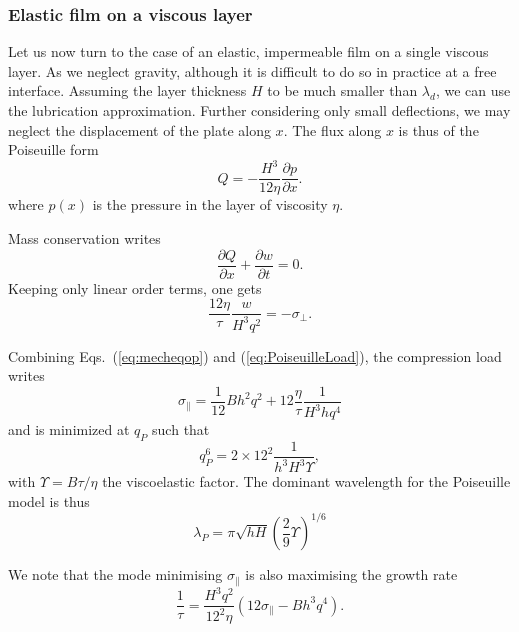\documentclass[twocolumn,superscriptaddress,showpacs,preprintnumbers,
amsmath,amssymb,prl]{revtex4-1}
\begin{document}
\subsubsection*{Elastic film on a viscous layer}
Let us now turn to the case of an elastic, impermeable film on a single viscous layer. As \cite{Huang2002} we neglect gravity, although it is difficult to do so in practice at a free interface. Assuming the layer thickness $H$ to be much smaller than $\lambda_d$, we can use the lubrication approximation. Further considering only small deflections, we may neglect the displacement of the plate along $x$. The flux along $x$ is thus of the Poiseuille form
\begin{equation}
Q = -\frac{H^3}{12\eta}\frac{\partial p}{\partial x}.
\label{eq:PoiseuilleFlux}
\end{equation}
where $p(x)$ is the pressure in the layer of viscosity $\eta$.

Mass conservation writes
\begin{equation}
\frac{\partial Q}{\partial x} + \frac{\partial w}{\partial t} = 0.
\label{eq:conservation}
\end{equation}
Keeping only linear order terms, one gets
\begin{equation}
\frac{12\eta}{\tau} \frac{w}{H^3q^2} = -\sigma_\perp.
\label{eq:PoiseuilleLoad}
\end{equation}

Combining Eqs.~(\ref{eq:mecheqop}) and (\ref{eq:PoiseuilleLoad}), the compression load writes
\begin{equation}
\sigma_\parallel = \frac{1}{12}B h^2 q^2 + 12\frac{\eta}{\tau}\frac{1}{H^3 h q^4}
\label{eq:sigma0P}
\end{equation}
and is minimized at $q_P$ such that
\begin{equation}
q_P^6 = 2\times 12^2 \frac{1}{h^3H^3\Upsilon},
\label{eq:qP}
\end{equation}
with $\Upsilon = B\tau/\eta$ the viscoelastic factor. The dominant wavelength for the Poiseuille model is thus
\begin{equation}
\lambda_P = \pi\sqrt{hH}\left(\frac{2}{9}\Upsilon\right)^{1/6}
\end{equation}

We note that the mode minimising $\sigma_\parallel$ is also maximising the growth rate
\begin{equation}
\frac{1}{\tau} = \frac{H^3q^2}{12^2\eta}\left(12\sigma_\parallel - Bh^3q^4\right).
\end{equation}
\end{document}
